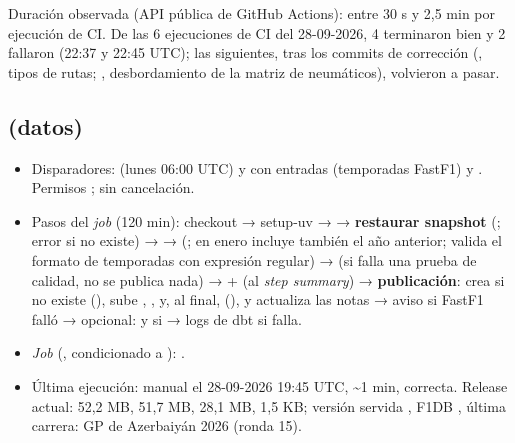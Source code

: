 Duración observada (API pública de GitHub Actions): entre 30 s y 2,5 min por ejecución de CI. De las 6 ejecuciones de CI del 28-09-2026, 4 terminaron bien y 2 fallaron (22:37 y 22:45 UTC); las siguientes, tras los commits de corrección (, tipos de rutas; , desbordamiento de la matriz de neumáticos), volvieron a pasar.

\subsection{ (datos)}

\begin{itemize}
\item Disparadores:  (lunes 06:00 UTC) y  con entradas  (temporadas FastF1) y . Permisos ;  sin cancelación.
\item Pasos del \emph{job}  (120 min): checkout → setup-uv →  → \textbf{restaurar snapshot} (; error si no existe) →  →  (; en enero incluye también el año anterior; valida el formato de temporadas con expresión regular) → \textbf{} (si falla una prueba de calidad, no se publica nada) →  +  (al \emph{step summary}) → \textbf{publicación}: crea  si no existe (), sube , ,  y, al final,  (), y actualiza las notas → aviso si FastF1 falló → opcional:  y  si  → logs de dbt si falla.
\item \emph{Job}  (, condicionado a ): .
\item Última ejecución: manual el 28-09-2026 19:45 UTC, \textasciitilde{}1 min, correcta. Release actual:  52,2 MB,  51,7 MB,  28,1 MB,  1,5 KB; versión servida , F1DB , última carrera: GP de Azerbaiyán 2026 (ronda 15).
\end{itemize}

